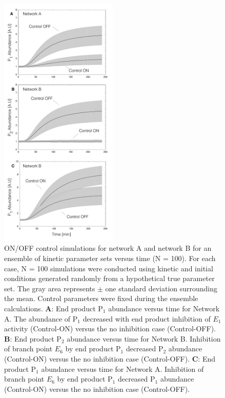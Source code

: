 \documentclass[12pt]{article}
\begin{document}
\begin{figure}
\centering
\includegraphics[width=0.50\textwidth]{./figs/Figure-4-OnOffSimulations.pdf}
\caption{ON/OFF control simulations for network A and network B for an ensemble of kinetic parameter sets versus time (N = 100). 
For each case, N = 100 simulations were conducted using kinetic and initial conditions generated randomly from a hypothetical true parameter set. 
The gray area represents $\pm$ one standard deviation surrounding the mean. 
Control parameters were fixed during the ensemble calculations.
\textbf{A}: End product P$_{1}$ abundance versus time for Network A. 
The abundance of P$_{1}$ decreased with end product inhibition of $E_{1}$ activity (Control-ON) versus the no inhibition case (Control-OFF). 
\textbf{B}: End product P$_{2}$ abundance versus time for Network B. Inhibition of branch point $E_{6}$ by end product P$_{1}$ decreased P$_{2}$ abundance (Control-ON) versus the
no inhibition case (Control-OFF).
\textbf{C}: End product P$_{1}$ abundance versus time for Network A. 
Inhibition of branch point $E_{6}$ by end product P$_{1}$ decreased P$_{1}$ abundance (Control-ON) versus the no inhibition case (Control-OFF).
}\label{fig-onoff-simulations}
\end{figure}
\end{document}
